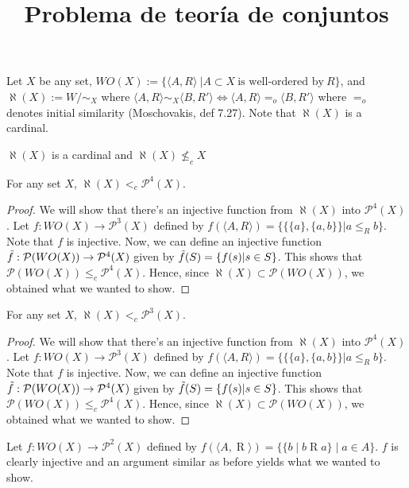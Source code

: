 \documentclass{article}
\title{Problema de teoría de conjuntos}
\begin{document}
\begin{definition}
    Let $X$ be any set, $WO(X):=\{\langle A,R\rangle\ |A\subset X \ \text{is well-ordered by}\ R\}$, and $\aleph(X):= W/{\sim_X}$ where $\langle A,R\rangle \sim_X \langle B, R'\rangle \Longleftrightarrow \langle A, R\rangle =_o \langle B, R'\rangle$ where $=_o$ denotes initial similarity (Moschovakis, def 7.27). Note that $\aleph(X)$ is a cardinal.
\end{definition}
\begin{claim}
    $\aleph(X)$ is a cardinal and $\aleph(X)\nleq_c X$
\end{claim}
\begin{theorem}
For any set $X$, $\aleph(X)<_c \mathcal{P}^4(X)$.
\end{theorem}
\begin{proof}
We will show that there's an injective function from $\aleph(X)$ into $\mathcal{P}^4(X)$. Let $f:WO(X)\rightarrow \mathcal{P}^3(X)$ defined by $f(\langle A,R\rangle) = \{\{\{a\},\{a,b\}\}| a\leq_R b\}$. Note that $f$ is injective. Now, we can define an injective function $\Tilde{f}: \mathcal{P} (WO(X)) \rightarrow \mathcal{P}^4(X)$ given by $\Tilde{f}(S) = \{f(s) | s\in S\}$. This shows that $\mathcal{P} (WO(X)) \leq_c \mathcal{P}^4(X)$. Hence, since $\aleph (X) \subset \mathcal{P} (WO(X))$, we obtained what we wanted to show.
\end{proof}
\begin{theorem}
	For any set $X$, $\aleph(X)<_c \mathcal{P}^3(X)$.
\end{theorem}
\begin{proof}
	We will show that there's an injective function from $\aleph(X)$ into $\mathcal{P}^4(X)$. Let $f:WO(X)\rightarrow \mathcal{P}^3(X)$ defined by $f(\langle A,R\rangle) = \{\{\{a\},\{a,b\}\}| a\leq_R b\}$. Note that $f$ is injective. Now, we can define an injective function $\Tilde{f}: \mathcal{P} (WO(X)) \rightarrow \mathcal{P}^4(X)$ given by $\Tilde{f}(S) = \{f(s) | s\in S\}$. This shows that $\mathcal{P} (WO(X)) \leq_c \mathcal{P}^4(X)$. Hence, since $\aleph (X) \subset \mathcal{P} (WO(X))$, we obtained what we wanted to show.
\end{proof}

Let $f:WO(X)\rightarrow \mathcal{P}^2(X)$ defined by $f(\langle A,\mathrel{R}\rangle) = \{\{b\mid b \mathrel{R} a\} \mid a\in A\}$. $f$ is clearly injective and an argument similar as before yields what we wanted to show.
\end{document}
